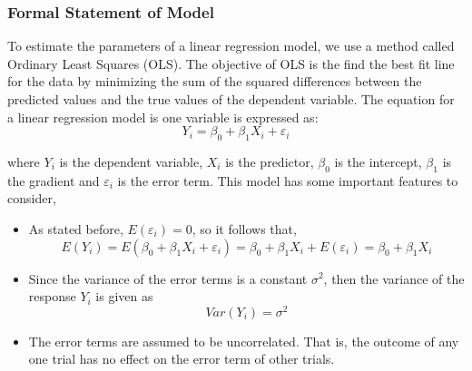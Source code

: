 \documentclass{article}[12pt]
\theoremstyle{definition}
\begin{document}
\newpage

\bigskip

\subsubsection{Formal Statement of Model}

\bigskip

To estimate the parameters of a linear regression model, we use a method called Ordinary Least Squares (OLS). The objective of OLS is the find the best fit line for the data by minimizing the sum of the squared differences between the predicted values and the true values of the dependent variable. The equation for a linear regression model is one variable is expressed as: $${Y_i} = \beta_0 + \beta_1 X_i + \varepsilon_i$$ 

\noindent
where ${Y_i}$ is the dependent variable, $X_i$ is the predictor, $\beta_0$ is the intercept, $\beta_1$ is the gradient and $\varepsilon_i$ is the error term. This model has some important features to consider, 

\begin{itemize}
    \item As stated before, $E(\varepsilon_i) = 0 $, so it follows that, $$ E(Y_i) = E(\beta_0 + \beta_1 X_i + \varepsilon_i) = \beta_0 + \beta_1 X_i + E(\varepsilon_i) = \beta_0 + \beta_1 X_i  $$
    \item Since the variance of the error terms is a constant $\sigma^2$, then the variance of the response $Y_i$ is given as $$Var (Y_i) = \sigma^2$$
    \item The error terms are assumed to be uncorrelated. That is, the outcome of any one trial has no effect on the error term of other trials. 
\end{itemize}

\bigskip
\end{document}
